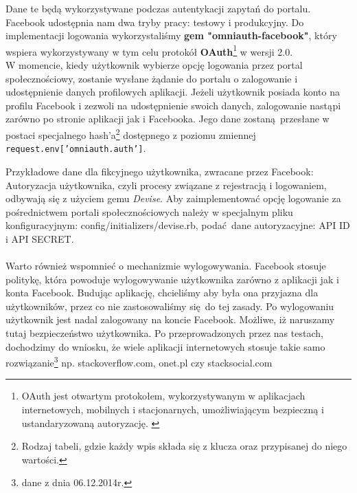 Dane te będą wykorzystywane podczas autentykacji zapytań do portalu. Facebook udostępnia nam dwa tryby pracy: testowy i produkcyjny. Do implementacji logowania wykorzystaliśmy \textbf{gem "omniauth-facebook"}, który wspiera wykorzystywany w tym celu protokół \textbf{OAuth}\footnote{OAuth jest otwartym protokołem, wykorzystywanym w aplikacjach internetowych, mobilnych i stacjonarnych, umożliwiającym bezpieczną i ustandaryzowaną autoryzację. \cite{oauth}} w  wersji 2.0.
\\

W momencie, kiedy użytkownik wybierze opcję logowania przez portal społecznościowy, zostanie wysłane żądanie do portalu o zalogowanie i udostępnienie danych profilowych aplikacji. Jeżeli użytkownik posiada konto na profilu Facebook i zezwoli na udostępnienie swoich danych, zalogowanie nastąpi zarówno po stronie aplikacji jak i Facebooka. Jego dane zostaną przesłane w postaci specjalnego hash'a\footnote{Rodzaj tabeli, gdzie każdy wpis składa się z klucza oraz przypisanej do niego wartości.} dostępnego z poziomu zmiennej \texttt{request.env['omniauth.auth']}.

\clearpage

Przykładowe dane dla fikcyjnego użytkownika, zwracane przez Facebook:\\


\clearpage
Autoryzacja użytkownika, czyli procesy związane z rejestracją i logowaniem, odbywają się z użyciem gemu \emph{Devise}. Aby zaimplementować opcję logowanie za pośrednictwem portali społecznościowych należy w specjalnym pliku konfiguracyjnym: config/initializers/devise.rb, podać dane autoryzacyjne: API ID i API SECRET.\\

 \\

Warto również wspomnieć o mechanizmie wylogowywania. Facebook stosuje politykę, która powoduje wylogowywanie użytkownika zarówno z aplikacji jak i konta Facebook. Budując aplikację, chcieliśmy aby była ona przyjazna dla użytkowników, przez co nie zastosowaliśmy się do tej zasady. Po wylogowaniu użytkownik jest nadal zalogowany na koncie Facebook. Możliwe, iż naruszamy tutaj bezpieczeństwo użytkownika. Po przeprowadzonych przez nas testach, dochodzimy do wniosku, że wiele aplikacji internetowych stosuje takie samo rozwiązanie\footnote{dane z dnia 06.12.2014r.} np. stackoverflow.com, onet.pl czy stacksocial.com
